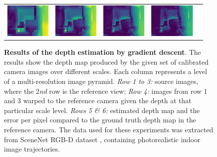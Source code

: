 \begin{figure}
\begin{center}
\begin{tabular}{c c c c c}
        \includegraphics[width=2.2cm]{main/chapter03/data/depth/error_2.jpg} &
        \includegraphics[width=2.2cm]{main/chapter03/data/depth/error_3.jpg} &
        \includegraphics[width=2.2cm]{main/chapter03/data/depth/error_4.jpg} &
        \includegraphics[width=2.2cm]{main/chapter03/data/depth/error_5.jpg} 
        \end{tabular}
    \end{center}
    \caption[Results of the depth estimation by gradient descent]{{\bf Results of the depth estimation by gradient descent}. The results show the depth map produced by the given set of calibrated camera images over different scales. Each column represents a level of a multi-resolution image pyramid. \textit{Row 1 to 3:} source images, where the 2\textit{nd} row is the reference view; \textit{Row 4:} images from row 1 and 3 warped to the reference camera given the depth at that particular scale level. \textit{Rows 5 \& 6:} estimated depth map and the error per pixel compared to the ground truth depth map in the reference camera. The data used for these experiments was extracted from SceneNet RGB-D dataset \citep{McCormac:etal:ICCV2017}, containing photorealistic indoor image trajectories.}
    \label{fig:multiview:depth_estimation}
\end{figure}
%

